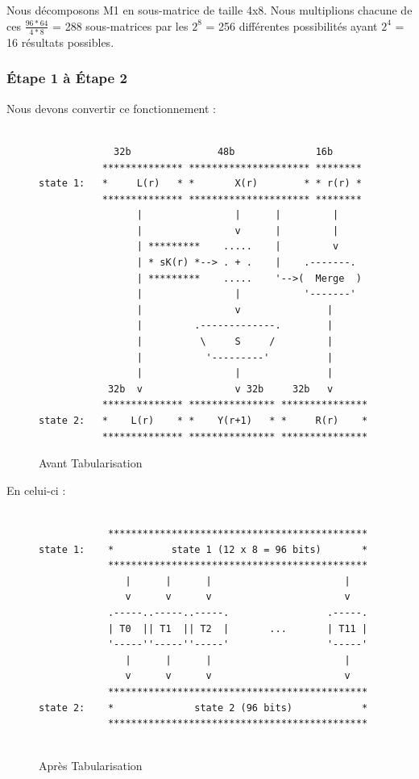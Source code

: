 \documentclass[a4paper,12pt]{article}
\begin{document}
\clearpage

Nous décomposons M1 en sous-matrice de taille 4x8. Nous multiplions chacune de ces $\frac{96*64}{4*8}$ = 288 sous-matrices par les $2^8$ = 256 différentes possibilités ayant $2^4$ = 16 résultats possibles.


\subsubsection{Étape 1 à Étape 2}

Nous devons convertir ce fonctionnement :

\begin{figure}[h]
\begin{verbatim}
			
             32b               48b              16b
           ************** ********************* ********
state 1:   *     L(r)   * *       X(r)        * * r(r) *
           ************** ********************* ********
                 |                |      |         |
                 |                v      |         |
                 | *********    .....    |         v
                 | * sK(r) *--> . + .    |    .-------.
                 | *********    .....    '-->(  Merge  )
                 |                |           '-------'
                 |                v               |
                 |         .-------------.        |
                 |          \     S     /         |
                 |           '---------'          |
                 |                |               |
            32b  v                v 32b     32b   v
           ************** *************** ***************
state 2:   *    L(r)    * *    Y(r+1)   * *     R(r)    *
           ************** *************** ***************

\end{verbatim}
\caption{Avant Tabularisation}
\label{fig:ascii-box}
\end{figure}		

\clearpage

En celui-ci :

\begin{figure}[h]
\begin{verbatim}

            *********************************************
state 1:    *          state 1 (12 x 8 = 96 bits)       *
            *********************************************
               |      |      |                       |
               v      v      v                       v
            .-----..-----..-----.                 .-----.
            | T0  || T1  || T2  |       ...       | T11 |
            '-----''-----''-----'                 '-----'
               |      |      |                       |
               v      v      v                       v
            *********************************************
state 2:    *              state 2 (96 bits)            *
            *********************************************			
			
\end{verbatim}
\caption{Après Tabularisation}
\label{fig:ascii-box}
\end{figure}		
		
\end{document}

